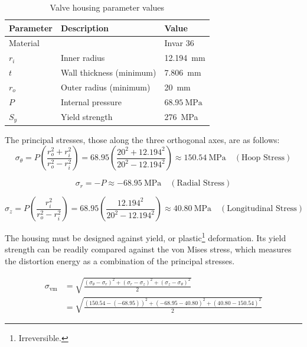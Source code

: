 \documentclass[12pt, letterpaper]{report}%
\newcommand{\specPressure}{\SI{68.95}{\mega \pascal}}%
\begin{document}
			\begin{table}[H]
				\centering
				\caption{Valve housing parameter values}
				\label{tab:housing_parameters}
				\begin{tabularx}{\textwidth}{l X l}
					\toprule
					\textbf{Parameter} & \textbf{Description} & \textbf{Value} \\
					\midrule
					Material &
					&
					Invar 36
					\\\addlinespace
					$r_i$ &
					Inner radius &
					\SI{12.194}{\milli\meter}
					\\\addlinespace
					$t$ &
					Wall thickness (minimum) &
					\SI{7.806}{\milli\meter}
					\\\addlinespace
					$r_o$ &
					Outer radius (minimum) &
					\SI{20}{\milli\meter}
					\\\addlinespace
					$P$ &
					Internal pressure &
					$\specPressure$
					\\\addlinespace
					$S_y$ &
					Yield strength &
					\SI{276}{\mega\pascal}
					\\\bottomrule
				\end{tabularx}
			\end{table}

			The principal stresses, those along the three orthogonal axes, are as follows\cite{ref_shigley}:
			\begin{equation}
			\sigma_{\theta} = P \left( \frac{r_o^2 + r_i^2}{r_o^2 - r_i^2} \right) = 68.95 \left( \frac{20^2 + 12.194^2}{20^2 - 12.194^2} \right) \approx \SI{150.54}{\mega\pascal} \quad (\text{Hoop Stress})
			\end{equation}

			\begin{equation}
			\sigma_{r} = -P \approx \SI{-68.95}{\mega\pascal} \quad (\text{Radial Stress})
			\end{equation}

			\begin{equation}
			\sigma_{z} = P \left( \frac{r_i^2}{r_o^2 - r_i^2} \right) = 68.95 \left( \frac{12.194^2}{20^2 - 12.194^2} \right) \approx \SI{40.80}{\mega\pascal} \quad (\text{Longitudinal Stress})
			\end{equation}
			
			The housing must be designed against yield, or plastic\footnote{Irreversible.} deformation.
			Its yield strength can be readily compared against the von Mises stress, which measures the distortion energy as a combination of the principal stresses.

			\begin{equation}
				\begin{aligned}
					\sigma_{\text{vm}} &= \sqrt{\frac{(\sigma_\theta - \sigma_r)^2 + (\sigma_r - \sigma_z)^2 + (\sigma_z - \sigma_\theta)^2}{2}} \\
					&= \sqrt{\frac{(150.54 - (-68.95))^2 + (-68.95 - 40.80)^2 + (40.80 - 150.54)^2}{2}}
				\end{aligned}
			\end{equation}
\end{document}
